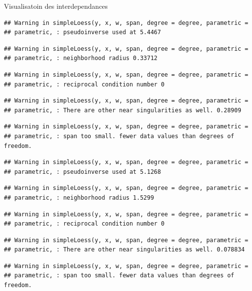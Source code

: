 \documentclass[11pt,ignorenonframetext,]{beamer}
\begin{document}
\begin{frame}[fragile]{Visualisatoin des interdependances}
\begin{verbatim}
## Warning in simpleLoess(y, x, w, span, degree = degree, parametric =
## parametric, : pseudoinverse used at 5.4467
\end{verbatim}

\begin{verbatim}
## Warning in simpleLoess(y, x, w, span, degree = degree, parametric =
## parametric, : neighborhood radius 0.33712
\end{verbatim}

\begin{verbatim}
## Warning in simpleLoess(y, x, w, span, degree = degree, parametric =
## parametric, : reciprocal condition number 0
\end{verbatim}

\begin{verbatim}
## Warning in simpleLoess(y, x, w, span, degree = degree, parametric =
## parametric, : There are other near singularities as well. 0.28909
\end{verbatim}

\begin{verbatim}
## Warning in simpleLoess(y, x, w, span, degree = degree, parametric =
## parametric, : span too small. fewer data values than degrees of freedom.
\end{verbatim}

\begin{verbatim}
## Warning in simpleLoess(y, x, w, span, degree = degree, parametric =
## parametric, : pseudoinverse used at 5.1268
\end{verbatim}

\begin{verbatim}
## Warning in simpleLoess(y, x, w, span, degree = degree, parametric =
## parametric, : neighborhood radius 1.5299
\end{verbatim}

\begin{verbatim}
## Warning in simpleLoess(y, x, w, span, degree = degree, parametric =
## parametric, : reciprocal condition number 0
\end{verbatim}

\begin{verbatim}
## Warning in simpleLoess(y, x, w, span, degree = degree, parametric =
## parametric, : There are other near singularities as well. 0.078834
\end{verbatim}

\begin{verbatim}
## Warning in simpleLoess(y, x, w, span, degree = degree, parametric =
## parametric, : span too small. fewer data values than degrees of freedom.
\end{verbatim}


\end{frame}
\end{document}
